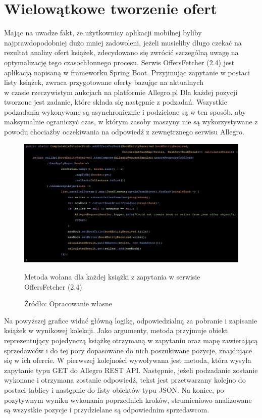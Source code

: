 \section{Wielowątkowe tworzenie ofert}
Mając na uwadze fakt, że użytkownicy aplikacji mobilnej byliby najprawdopodobniej dużo mniej zadowoleni, jeżeli musieliby długo czekać na rezultat analizy ofert książek, zdecydowano się zwrócić szczególną uwagę na optymalizację tego czasochłonnego procesu.
Serwis OffersFetcher (2.4) jest aplikacją napisaną w frameworku Spring Boot. Przyjmując zapytanie w postaci listy książek, zwraca przygotowane oferty bazując na aktualnych\\w czasie rzeczywistym aukcjach na platformie Allegro.pl\newline
Dla każdej pozycji tworzone jest zadanie, które składa się następnie z podzadań. Wszystkie podzadania wykonywane są asynchronicznie i podzielone są w ten sposób, aby maksymalnie ograniczyć czas, w którym zasoby maszyny nie są wykorzystywane z powodu chociażby oczekiwania na odpowiedź z zewnętrznego serwisu Allegro.
\begin{figure}[H]
	\centering
	\includegraphics[width=\linewidth]{tasks.pdf}
	\caption{\centering Metoda wołana dla każdej książki z zapytania w serwisie OffersFetcher (2.4)}
	\caption*{\centering Źródło: {Opracowanie własne}}
\end{figure}
Na powyższej grafice widać główną logikę, odpowiedzialną za pobranie i zapisanie książek w wynikowej kolekcji. Jako argumenty, metoda przyjmuje obiekt reprezentujący pojedynczą książkę otrzymaną w zapytaniu oraz mapę zawierającą sprzedawców i do tej pory dopasowane do nich poszukiwane pozycje, znajdujące się w ich ofercie.
W pierwszej kolejności wywoływana jest metoda, która wysyła zapytanie typu GET do Allegro REST API. Następnie, jeżeli podzadanie zostanie wykonane i otrzymana zostanie odpowiedź, tekst jest przetwarzany kolejno do postaci tablicy i następnie do listy obiektów typu JSON.
Na koniec, po pozytywnym wyniku wykonania poprzednich kroków, strumieniowo analizowane są wszystkie pozycje i przydzielane są odpowiednim sprzedawcom.

